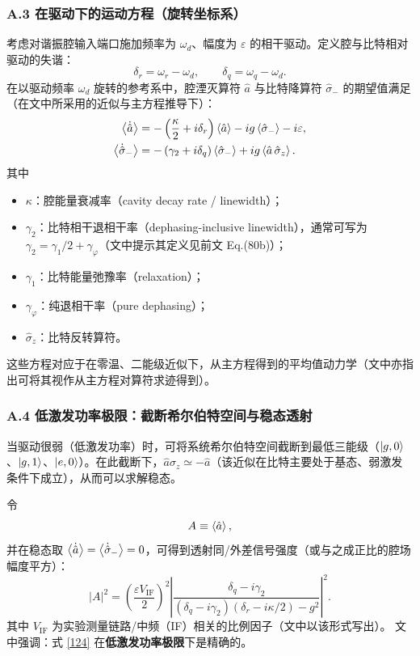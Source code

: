 \documentclass[12pt,a4paper,oneside]{ctexbook}
\begin{document}
\subsubsection{A.3 在驱动下的运动方程（旋转坐标系）}
考虑对谐振腔输入端口施加频率为 $\omega_d$、幅度为 $\varepsilon$ 的相干驱动。定义腔与比特相对驱动的失谐：
\[
\delta_r=\omega_r-\omega_d,\qquad \delta_q=\omega_q-\omega_d.
\]
在以驱动频率 $\omega_d$ 旋转的参考系中，腔湮灭算符 $\hat a$ 与比特降算符 $\hat\sigma_-$ 的期望值满足（在文中所采用的近似与主方程推导下）：
$$
\begin{aligned}
\expval{\dot{\hat a}}
&=
-\left(\frac{\kappa}{2}+i\delta_r\right)\expval{\hat a}
-i g \expval{\hat\sigma_-}
-i\varepsilon,
\\
\expval{\dot{\hat\sigma}_-}
&=
-\left(\gamma_2+i\delta_q\right)\expval{\hat\sigma_-}
+i g \expval{\hat a\,\hat\sigma_z}.
\end{aligned}
$$
其中
\begin{itemize}
\item $\kappa$：腔能量衰减率（cavity decay rate / linewidth）；
\item $\gamma_2$：比特相干退相干率（dephasing-inclusive linewidth），通常可写为
$\gamma_2=\gamma_1/2+\gamma_\varphi$（文中提示其定义见前文 Eq.(80b)）；
\item $\gamma_1$：比特能量弛豫率（relaxation）；
\item $\gamma_\varphi$：纯退相干率（pure dephasing）；
\item $\hat\sigma_z$：比特反转算符。
\end{itemize}
这些方程对应于在零温、二能级近似下，从主方程得到的平均值动力学（文中亦指出可将其视作从主方程对算符求迹得到）。

\subsubsection{A.4 低激发功率极限：截断希尔伯特空间与稳态透射}
当驱动很弱（低激发功率）时，可将系统希尔伯特空间截断到最低三能级（$\ket{g,0}$、$\ket{g,1}$、$\ket{e,0}$）。在此截断下，$\hat a\hat\sigma_z\simeq -\hat a$（该近似在比特主要处于基态、弱激发条件下成立），从而可以求解稳态。

令
\[
A\equiv \expval{\hat a},
\]
并在稳态取 $\expval{\dot{\hat a}}=\expval{\dot{\hat\sigma}_-}=0$，可得到透射同/外差信号强度（或与之成正比的腔场幅度平方）：
\begin{equation}
|A|^2
=
\left(\frac{\varepsilon V_{\mathrm{IF}}}{2}\right)^2
\left|
\frac{\delta_q-i\gamma_2}{
(\delta_q-i\gamma_2)(\delta_r-i\kappa/2)-g^2
}
\right|^2.
\tag{124}
\end{equation}
其中 $V_{\mathrm{IF}}$ 为实验测量链路/中频（IF）相关的比例因子（文中以该形式写出）。
文中强调：式 \eqref{124} 在\textbf{低激发功率极限}下是精确的。
\end{document}
